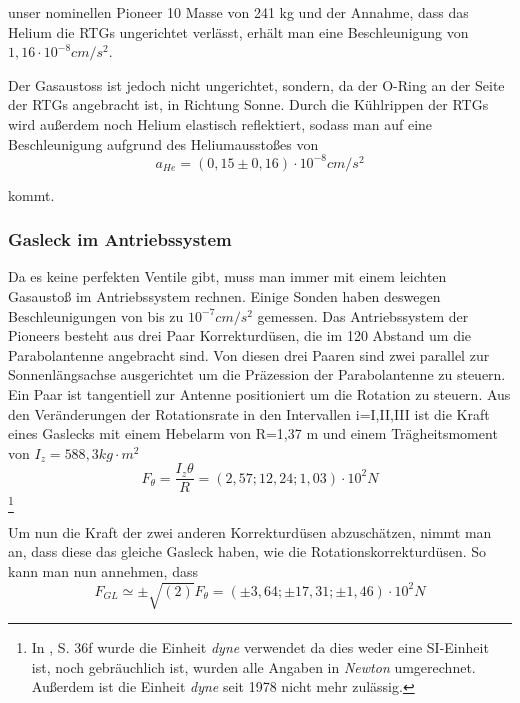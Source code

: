 unser nominellen Pioneer 10 Masse von 241 kg und der Annahme, dass das
Helium die RTGs ungerichtet verl\"asst, erh\"alt man eine
Beschleunigung von  $1,16\cdot 10^{-8}\mathit{cm}/s^{2}$. 

Der Gasaustoss ist jedoch nicht ungerichtet, sondern, da der O-Ring an
der Seite der RTGs angebracht ist, in Richtung Sonne. Durch die
K\"uhlrippen der RTGs wird au{\ss}erdem noch Helium elastisch
reflektiert, sodass man auf eine Beschleunigung aufgrund des
Heliumaussto{\ss}es von 
\begin{equation}
a_{\mathit{He}}=(0,15\pm 0,16)\cdot 10^{-8}\mathit{cm}/s^{2}
\end{equation}

kommt\cite{Anderson2002}.


\bigskip

\subsubsection{Gasleck im Antriebssystem}

Da es keine perfekten Ventile gibt, muss man immer mit einem leichten
Gasausto{\ss} im Antriebssystem rechnen. Einige Sonden\cite{Anderson2002} haben
deswegen Beschleunigungen von bis zu  $10^{-7}\mathit{cm}/s^{2}$
gemessen. Das Antriebssystem der Pioneers besteht aus drei Paar
Korrekturd\"usen, die im 120{\textdegree} Abstand um die Parabolantenne
angebracht sind. Von diesen drei Paaren sind zwei parallel zur
Sonnenl\"angsachse ausgerichtet um die Pr\"azession der Parabolantenne
zu steuern. Ein Paar ist tangentiell zur Antenne positioniert um die
Rotation zu steuern. Aus den Ver\"anderungen der Rotationsrate in den
Intervallen i=I,II,III ist die Kraft eines Gaslecks mit einem Hebelarm
von R=1,37 m und einem Tr\"agheitsmoment von 
$I_{z}=588,3\mathit{kg}\cdot m^{2}$
\begin{equation}
F_{\theta }=\frac{I_{z}\theta }{R}=(2,57;12,24;1,03)\cdot
10^{2}N
\end{equation}
\footnote{
In \cite{Anderson2002}, S. 36f wurde die Einheit
\textit{dyne} verwendet da dies weder eine SI-Einheit ist, noch
gebr\"auchlich ist, wurden alle Angaben in \textit{Newton} umgerechnet.
Au{\ss}erdem ist die Einheit \textit{dyne }seit 1978\cite{wp} nicht
mehr zul\"assig.
}

Um nun die Kraft der zwei anderen Korrekturd\"usen abzusch\"atzen, nimmt
man an, dass diese das gleiche Gasleck haben, wie die
Rotationskorrekturd\"usen. So kann man nun annehmen\cite{Anderson2002}, dass
\begin{equation}
F_{\mathit{GL}}\simeq \pm \sqrt{(2)}F_{\theta }=(\pm 3,64;\pm
17,31;\pm 1,46)\cdot 10^{2}N
\end{equation}

